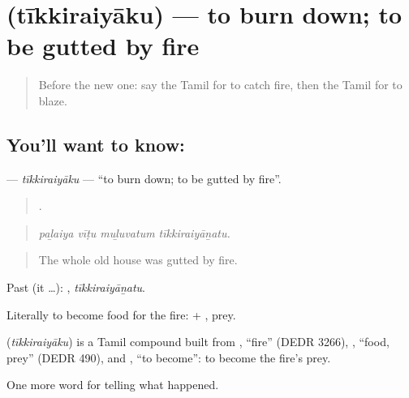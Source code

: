 \section[\texorpdfstring{\ta{தீக்கிரையாகு} (tīkkiraiyāku)}{தீக்கிரையாகு (tīkkiraiyāku)}]{ (tīkkiraiyāku) — to burn down; to be gutted by fire}

\label{lesson:TA-C299-tikkiraiyaku}



\begin{quote}
Before the new one: say the Tamil for to catch fire, then the Tamil for to blaze.
\end{quote}

\subsection*{You'll want to know: }
\textbf{} — \emph{tīkkiraiyāku} — \textquotedblleft{}to burn down; to be gutted by fire\textquotedblright{}.

\begin{quote}
   .
\end{quote}

\begin{quote}
\emph{paḻaiya vīṭu muḻuvatum tīkkiraiyāṉatu.}
\end{quote}

\begin{quote}
The whole old house was gutted by fire.
\end{quote}

Past (it …): , \emph{tīkkiraiyāṉatu}.

Literally to become food for the fire:  + , prey.

\begin{cousinweb}
\textbf{} (\emph{tīkkiraiyāku}) is a Tamil compound built from , \textquotedblleft{}fire\textquotedblright{} (DEDR 3266), , \textquotedblleft{}food, prey\textquotedblright{} (DEDR 490), and , \textquotedblleft{}to become\textquotedblright{}: to become the fire's prey.
\end{cousinweb}

\begin{grammarlens}[title={What you've built}]
One more word for telling what happened.
\end{grammarlens}


